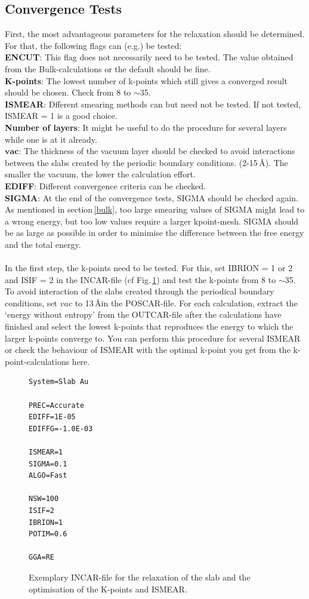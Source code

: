 \documentclass[twoside, 11pt, titlepage, captions=nooneline, a4paper, headsepline]{scrbook}%
\begin{document}
\subsection{Convergence Tests}
First, the most advantageous parameters for the relaxation should be determined. For that, the following flags can (e.g.) be tested:\\
\textbf{ENCUT}: This flag does not necessarily need to be tested. The value obtained from the Bulk-calculations or the default should be fine.\\
\textbf{K-points}: The lowest number of k-points which still gives a converged result should be chosen. Check from 8 to $\sim$35.\\
\textbf{ISMEAR}: Dfferent smearing methods can but need not be tested. If not tested, ISMEAR = 1 is a good choice.\\
\textbf{Number of layers}: It might be useful to do the procedure for several layers while one is at it already.\\
$\textbf{vac}$: The thickness of the vacuum layer should be checked to avoid interactions between the slabs created by the periodic boundary conditions. (2-15\,\AA). The smaller the vacuum, the lower the calculation effort.\\
\textbf{EDIFF}: Different convergence criteria can be checked.\\
\textbf{SIGMA}: At the end of the convergence tests, SIGMA should be checked again. As mentioned in section\,\ref{bulk}, too large smearing values of SIGMA might lead to a wrong energy, but too low values require a larger kpoint-mesh. SIGMA should be as large as possible in order to minimise the difference between the free energy and the total energy.\\
\\
In the first step, the k-points need to be tested. For this, set IBRION = 1 or 2 and ISIF = 2 in the INCAR-file (cf Fig.\,\ref{slabincar1}) and test the k-points from 8 to $\sim$35. To avoid interaction of the slabs created through the periodical boundary conditions, set $vac$ to 13\,\AA in the POSCAR-file.
For each calculation, extract the `energy without entropy' from the OUTCAR-file after the calculations have finished and select the lowest k-points that reproduces the energy to which the larger k-points converge to. You can perform this procedure for several ISMEAR or check the behaviour of ISMEAR with the optimal k-point you get from the k-point-calculations here.
\begin{figure}[h!!]
\begin{verbatim}
System=Slab Au

PREC=Accurate
EDIFF=1E-05
EDIFFG=-1.0E-03

ISMEAR=1
SIGMA=0.1
ALGO=Fast

NSW=100
ISIF=2
IBRION=1
POTIM=0.6

GGA=RE
\end{verbatim}
\caption{Exemplary INCAR-file for the relaxation of the slab and the optimisation of the K-points and ISMEAR.}
\label{slabincar1}
\end{figure}
\end{document}
